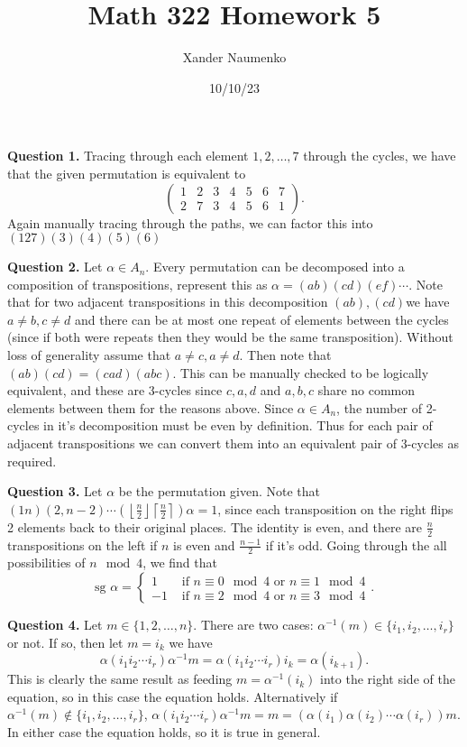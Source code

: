 \documentclass[letterpaper, reqno,11pt]{article}
\begin{document}
\title{Math 322 Homework 5}
\date{10/10/23}
\author{Xander Naumenko}
\maketitle

{\medskip\noindent\bf Question 1.} Tracing through each element $1,2,\ldots,7$ through the cycles, we have that the given permutation is equivalent to
\[
    \begin{pmatrix} 1&2&3&4&5&6&7\\2&7&3&4&5&6&1 \end{pmatrix} 
.\]
Again manually tracing through the paths, we can factor this into $(127)(3)(4)(5)(6)$

{\medskip\noindent\bf Question 2.} Let $\alpha\in A_n$. Every permutation can be decomposed into a composition of transpositions, represent this as $\alpha=(ab)(cd)(ef)\cdots$. Note that for two adjacent transpositions in this decomposition $(ab),(cd)$we have $a\neq b,c\neq d$ and there can be at most one repeat of elements between the cycles (since if both were repeats then they would be the same transposition). Without loss of generality assume that $a\neq c,a\neq d$. Then note that $(ab)(cd)=(cad)(abc)$. This can be manually checked to be logically equivalent, and these are 3-cycles since $c,a,d$ and $a,b,c$ share no common elements between them for the reasons above. Since $\alpha\in A_n$, the number of 2-cycles in it's decomposition must be even by definition. Thus for each pair of adjacent transpositions we can convert them into an equivalent pair of 3-cycles as required.

{\medskip\noindent\bf Question 3.} Let $\alpha$ be the permutation given. Note that $(1n)(2,n-2)\cdots(\left\lfloor \frac{n}{2} \right\rfloor\left\lceil \frac{n}{2} \right\rceil)\alpha=1$, since each transposition on the right flips 2 elements back to their original places. The identity is even, and there are $\frac{n}{2}$ transpositions on the left if $n$ is even and $\frac{n-1}{2}$ if it's odd. Going through the all possibilities of $n\mod 4$, we find that
\[
\text{sg }\alpha=\begin{cases}
    1&\text{ if }n\equiv 0\mod 4\text{ or }n\equiv 1\mod 4\\
    -1&\text{ if }n\equiv 2\mod 4\text{ or }n\equiv 3\mod 4
\end{cases}
.\]

{\medskip\noindent\bf Question 4.} Let $m\in \{1,2,\ldots,n\}$. There are two cases: $\alpha^{-1}(m)\in \{i_1,i_2,\ldots,i_r\}$ or not. If so, then let $m=i_k$ we have
\[
\alpha(i_1i_2\cdots i_r)\alpha^{-1}m=\alpha(i_1i_2\cdots i_r)i_k=\alpha(i_{k+1})
.\]
This is clearly the same result as feeding $m=\alpha^{-1}(i_k)$ into the right side of the equation, so in this case the equation holds. Alternatively if $\alpha^{-1}(m)\notin \{i_1,i_2,\ldots,i_r\}$, $\alpha(i_1i_2\cdots i_r)\alpha^{-1}m=m=(\alpha(i_1)\alpha(i_2)\cdots \alpha(i_r))m$. In either case the equation holds, so it is true in general.
\end{document}
